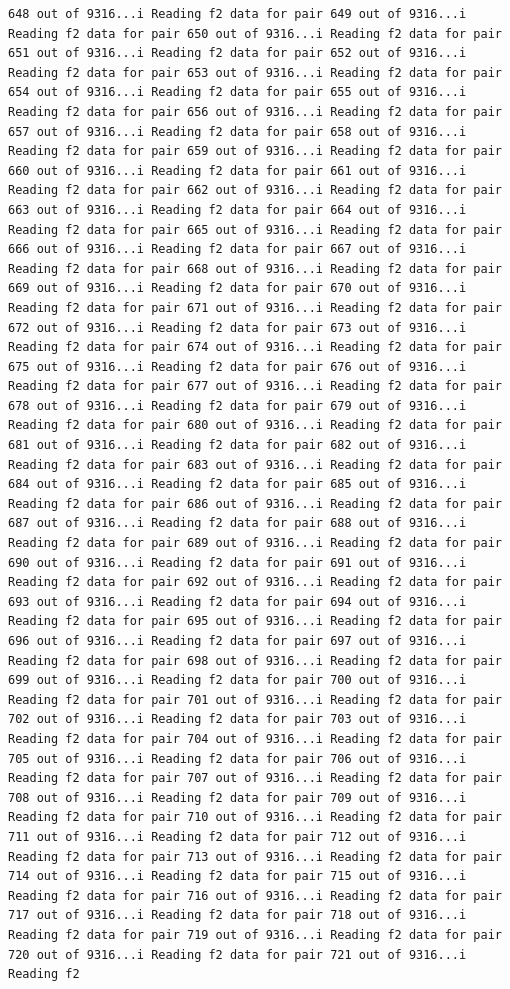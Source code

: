 \documentclass[
]{article}
\begin{document}
\begin{verbatim}
648 out of 9316...i Reading f2 data for pair 649 out of 9316...i Reading f2 data for pair 650 out of 9316...i Reading f2 data for pair 651 out of 9316...i Reading f2 data for pair 652 out of 9316...i Reading f2 data for pair 653 out of 9316...i Reading f2 data for pair 654 out of 9316...i Reading f2 data for pair 655 out of 9316...i Reading f2 data for pair 656 out of 9316...i Reading f2 data for pair 657 out of 9316...i Reading f2 data for pair 658 out of 9316...i Reading f2 data for pair 659 out of 9316...i Reading f2 data for pair 660 out of 9316...i Reading f2 data for pair 661 out of 9316...i Reading f2 data for pair 662 out of 9316...i Reading f2 data for pair 663 out of 9316...i Reading f2 data for pair 664 out of 9316...i Reading f2 data for pair 665 out of 9316...i Reading f2 data for pair 666 out of 9316...i Reading f2 data for pair 667 out of 9316...i Reading f2 data for pair 668 out of 9316...i Reading f2 data for pair 669 out of 9316...i Reading f2 data for pair 670 out of 9316...i Reading f2 data for pair 671 out of 9316...i Reading f2 data for pair 672 out of 9316...i Reading f2 data for pair 673 out of 9316...i Reading f2 data for pair 674 out of 9316...i Reading f2 data for pair 675 out of 9316...i Reading f2 data for pair 676 out of 9316...i Reading f2 data for pair 677 out of 9316...i Reading f2 data for pair 678 out of 9316...i Reading f2 data for pair 679 out of 9316...i Reading f2 data for pair 680 out of 9316...i Reading f2 data for pair 681 out of 9316...i Reading f2 data for pair 682 out of 9316...i Reading f2 data for pair 683 out of 9316...i Reading f2 data for pair 684 out of 9316...i Reading f2 data for pair 685 out of 9316...i Reading f2 data for pair 686 out of 9316...i Reading f2 data for pair 687 out of 9316...i Reading f2 data for pair 688 out of 9316...i Reading f2 data for pair 689 out of 9316...i Reading f2 data for pair 690 out of 9316...i Reading f2 data for pair 691 out of 9316...i Reading f2 data for pair 692 out of 9316...i Reading f2 data for pair 693 out of 9316...i Reading f2 data for pair 694 out of 9316...i Reading f2 data for pair 695 out of 9316...i Reading f2 data for pair 696 out of 9316...i Reading f2 data for pair 697 out of 9316...i Reading f2 data for pair 698 out of 9316...i Reading f2 data for pair 699 out of 9316...i Reading f2 data for pair 700 out of 9316...i Reading f2 data for pair 701 out of 9316...i Reading f2 data for pair 702 out of 9316...i Reading f2 data for pair 703 out of 9316...i Reading f2 data for pair 704 out of 9316...i Reading f2 data for pair 705 out of 9316...i Reading f2 data for pair 706 out of 9316...i Reading f2 data for pair 707 out of 9316...i Reading f2 data for pair 708 out of 9316...i Reading f2 data for pair 709 out of 9316...i Reading f2 data for pair 710 out of 9316...i Reading f2 data for pair 711 out of 9316...i Reading f2 data for pair 712 out of 9316...i Reading f2 data for pair 713 out of 9316...i Reading f2 data for pair 714 out of 9316...i Reading f2 data for pair 715 out of 9316...i Reading f2 data for pair 716 out of 9316...i Reading f2 data for pair 717 out of 9316...i Reading f2 data for pair 718 out of 9316...i Reading f2 data for pair 719 out of 9316...i Reading f2 data for pair 720 out of 9316...i Reading f2 data for pair 721 out of 9316...i Reading f2 
\end{verbatim}
\end{document}

